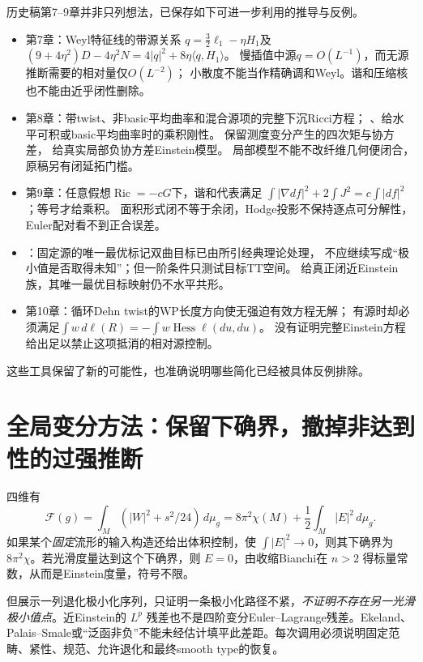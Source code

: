 \documentclass[UTF8,a4paper,11pt,fontset=fandol]{ctexart}
\numberwithin{equation}{section}
\theoremstyle{definition}
\newcommand{\Ric}{\operatorname{Ric}}
\newcommand{\dd}{\,d\mu_g}
\begin{document}
历史稿第7--9章并非只列想法，已保存如下可进一步利用的推导与反例。
\begin{itemize}
\item 第7章：Weyl特征线的带源关系
$q=\tfrac32\ell_1-\eta H_1$及
$(9+4\eta^2)D-4\eta^2N=4|q|^2+8\eta\langle q,H_1\rangle$。
慢插值中源$q=O(L^{-1})$，而无源推断需要的相对量仅$O(L^{-2})$；
小散度不能当作精确调和Weyl。谐和压缩核也不能由近乎闭性删除。
\item 第8章：带twist、非basic平均曲率和混合源项的完整下沉Ricci方程；
、给水平可积或basic平均曲率时的乘积刚性。
保留测度变分产生的四次矩与协方差，
给真实局部负协方差Einstein模型。
局部模型不能不改纤维几何便闭合，原稿另有闭延拓门槛。
\item 第9章：任意假想$\Ric=-cG$下，谐和代表满足
$\int|\nabla df|^2+2\int J^2=c\int|df|^2$；等号才给乘积。
面积形式闭不等于余闭，Hodge投影不保持逐点可分解性，Euler配对看不到正合误差。
\item {}：固定源的唯一最优标记双曲目标已由所引经典理论处理，
不应继续写成“极小值是否取得未知”；但一阶条件只测试目标TT空间。
给真正闭近Einstein族，其唯一最优目标映射仍不水平共形。
\item 第10章：循环Dehn twist的WP长度方向使无强迫有效方程无解；
有源时却必须满足$\int w\,d\ell(R)=-\int w\operatorname{Hess}\ell(du,du)$。
没有证明完整Einstein方程给出足以禁止这项抵消的相对源控制。
\end{itemize}
这些工具保留了新的可能性，也准确说明哪些简化已经被具体反例排除。

\section{全局变分方法：保留下确界，撤掉非达到性的过强推断}
四维有
\begin{equation}\label{eq:F}
\mathcal F(g)=\int_M(|W|^2+s^2/24)\dd
=8\pi^2\chi(M)+\frac12\int_M|E|^2\dd.
\end{equation}
如果某个\emph{固定}流形的输入构造还给出体积控制，使 $\int|E|^2\to0$，则其下确界为 $8\pi^2\chi$。若光滑度量达到这个下确界，则 $E=0$，由收缩Bianchi在 $n>2$ 得标量常数，从而是Einstein度量，符号不限。

但展示一列退化极小化序列，只证明一条极小化路径不紧，\emph{不证明不存在另一光滑极小值点}。近Einstein的 $L^p$ 残差也不是四阶变分Euler--Lagrange残差。Ekeland、Palais--Smale或“泛函非负”不能未经估计填平此差距。每次调用必须说明固定范畴、紧性、规范、允许退化和最终smooth type的恢复。
\end{document}
